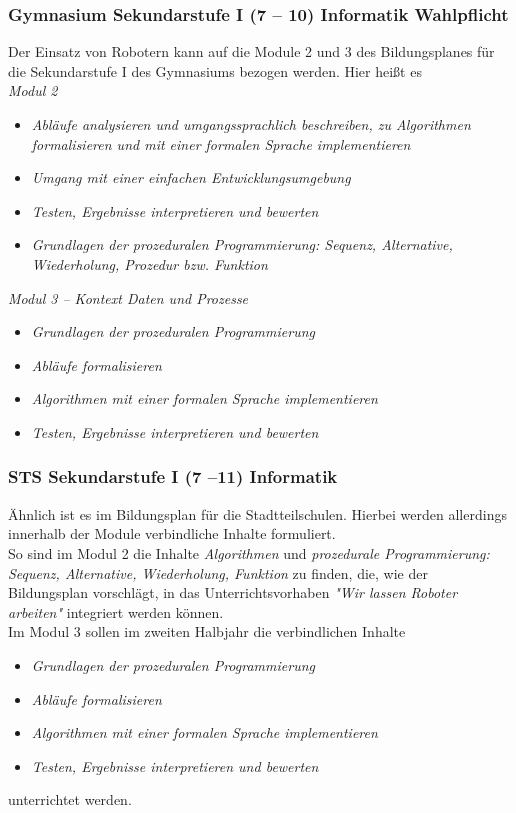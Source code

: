 \documentclass[paper=a4, pagesize, DIV=calc, BCOR=12.5mm, twoside=on, onecolumn=on, open = any, titlepage =on, parskip =half-, headsepline = on, footsepline = on, chapterprefix = on, appendixprefix = off, fontsize = 12pt, numbers = noenddot, abstract = on]{scrbook}
\numberwithin{equation}{chapter}
\theoremstyle{definition}
\theoremstyle{plain}
\theoremstyle{plain}
\theoremstyle{remark}
\theoremstyle{plain}
\theoremstyle{plain}
\begin{document}
\subsubsection{Gymnasium Sekundarstufe I (7 -- 10) Informatik Wahlpflicht}
Der Einsatz von Robotern kann auf die Module 2 und 3 des Bildungsplanes für die Sekundarstufe I des Gymnasiums bezogen werden. Hier heißt es\\

\emph{Modul 2}
\begin{itemize}
\item \emph{Abläufe analysieren und umgangssprachlich beschreiben, zu Algorithmen formalisieren und mit einer formalen Sprache implementieren}
\item \emph{Umgang mit einer einfachen Entwicklungsumgebung}
\item \emph{Testen, Ergebnisse interpretieren und bewerten}
\item \emph{Grundlagen der prozeduralen Programmierung: Sequenz, Alternative, Wiederholung, Prozedur bzw. Funktion}
\end{itemize}

\emph{Modul 3 -- Kontext Daten und Prozesse}
\begin{itemize}
\item \emph{Grundlagen der prozeduralen Programmierung}
\item \emph{Abläufe formalisieren}
\item \emph{Algorithmen mit einer formalen Sprache implementieren}
\item \emph{Testen, Ergebnisse interpretieren und bewerten}
\end{itemize}


\subsubsection{STS Sekundarstufe I (7 --11) Informatik}
Ähnlich ist es im Bildungsplan für die Stadtteilschulen. Hierbei werden allerdings innerhalb der Module verbindliche Inhalte formuliert.\\

So sind im Modul 2 die Inhalte \emph{Algorithmen} und \emph{prozedurale Programmierung: Sequenz, Alternative, Wiederholung, Funktion} zu finden, die, wie der Bildungsplan vorschlägt, in das Unterrichtsvorhaben \emph{"Wir lassen Roboter arbeiten"} integriert werden können.\\

Im Modul 3 sollen im zweiten Halbjahr die verbindlichen Inhalte
\begin{itemize}
\item \emph{Grundlagen der prozeduralen Programmierung}
\item \emph{Abläufe formalisieren}
\item \emph{Algorithmen mit einer formalen Sprache implementieren}
\item \emph{Testen, Ergebnisse interpretieren und bewerten}
\end{itemize}
unterrichtet werden. 
\end{document}
